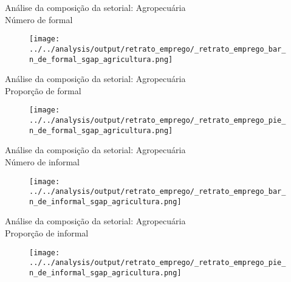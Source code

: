 \begin{frame}[label=_retrato_emprego_bar_n_de_formal_sgap_agricultura]{{\small Análise da composição da setorial: Agropecuária \\  Número de formal}}
\textit{\hyperlink{_retrato_emprego_sgap_agricultura}{}}
\begin{figure}
  \centering
  \texttt{[image: ../../analysis/output/retrato\_emprego/\_retrato\_emprego\_bar\_n\_de\_formal\_sgap\_agricultura.png]}
  \caption{}
  \label{fig:_retrato_emprego_bar_n_de_formal_sgap_agricultura}
\end{figure}
\end{frame}



\begin{frame}[label=_retrato_emprego_pie_n_de_formal_sgap_agricultura]{{\small Análise da composição da setorial: Agropecuária \\  Proporção de formal}}
\textit{\hyperlink{_retrato_emprego_sgap_agricultura}{}}
\begin{figure}
  \centering
  \texttt{[image: ../../analysis/output/retrato\_emprego/\_retrato\_emprego\_pie\_n\_de\_formal\_sgap\_agricultura.png]}
  \caption{}
  \label{fig:_retrato_emprego_pie_n_de_formal_sgap_agricultura}
\end{figure}
\end{frame}


\begin{frame}[label=_retrato_emprego_bar_n_de_informal_sgap_agricultura]{{\small Análise da composição da setorial: Agropecuária \\  Número de informal}}
\textit{\hyperlink{_retrato_emprego_sgap_agricultura}{}}
\begin{figure}
  \centering
  \texttt{[image: ../../analysis/output/retrato\_emprego/\_retrato\_emprego\_bar\_n\_de\_informal\_sgap\_agricultura.png]}
  \caption{}
  \label{fig:_retrato_emprego_bar_n_de_informal_sgap_agricultura}
\end{figure}
\end{frame}


\begin{frame}[label=_retrato_emprego_pie_n_de_informal_sgap_agricultura]{{\small Análise da composição da setorial: Agropecuária \\  Proporção de informal}}
\textit{\hyperlink{_retrato_emprego_sgap_agricultura}{}}
\begin{figure}
  \centering
  \texttt{[image: ../../analysis/output/retrato\_emprego/\_retrato\_emprego\_pie\_n\_de\_informal\_sgap\_agricultura.png]}
  \caption{}
  \label{fig:_retrato_emprego_pie_n_de_informal_sgap_agricultura}
\end{figure}
\end{frame}

